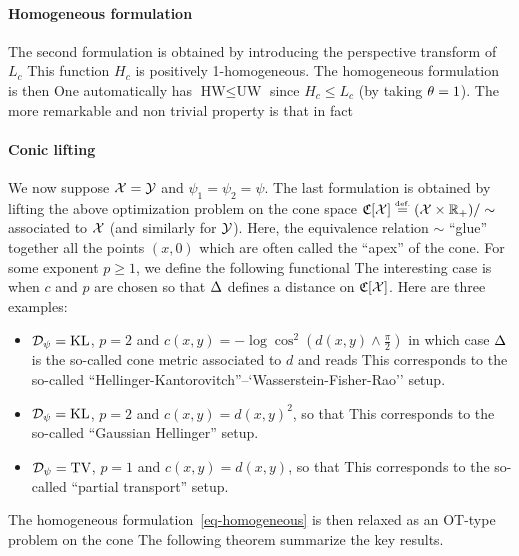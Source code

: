 \paragraph{Homogeneous formulation}

The second formulation is obtained by introducing the perspective transform of $L_c$
This function $H_c$ is positively 1-homogeneous.
%
The homogeneous formulation is then 
One automatically has $\text{HW} \leq \text{UW}$ since $H_c \leq L_c$ (by taking $\theta=1$). The more remarkable and non trivial property is that in fact 

\paragraph{Conic lifting}

We now suppose $\mathcal{X}=\mathcal{Y}$ and $\psi_1=\psi_2=\psi$.
%
The last formulation is obtained by lifting the above optimization problem on the cone space $\mathfrak{C}[\mathcal{X}] \stackrel{\mbox{\upshape\tiny def.}}{=} (\mathcal{X} \times \mathbb{R}_+) / \sim$   associated to $\mathcal{X}$ (and similarly for $\mathcal{Y}$). Here, the equivalence relation $\sim$ ``glue'' together all the points $(x,0)$ which are often called the ``apex'' of the cone. For some exponent $p \geq 1$, we define the following functional 
The interesting case is when $c$ and $p$ are chosen so that $\Delta$ defines a distance on $\mathfrak{C}[\mathcal{X}]$. Here are three examples:
\begin{itemize}
	\item $\mathcal{D}_\psi=\operatorname{KL}$, $p=2$ and $c(x,y)=-\log \cos^2(d(x,y) \wedge \frac{\pi}{2})$ in which case $\Delta$ is the so-called cone metric associated to $d$ and reads
		This corresponds to the so-called ``Hellinger-Kantorovitch''--`Wasserstein-Fisher-Rao'' setup.
	\item $\mathcal{D}_\psi=\operatorname{KL}$, $p=2$ and $c(x,y)=d(x,y)^2$, so that 
		This corresponds to the so-called ``Gaussian Hellinger'' setup.
	\item $\mathcal{D}_\psi=\operatorname{TV}$, $p=1$ and $c(x,y)=d(x,y)$, so that 
		This corresponds to the so-called ``partial transport'' setup.
\end{itemize}
The homogeneous formulation~\eqref{eq-homogeneous} is then relaxed as an OT-type problem on the cone
The following theorem summarize the key results.

